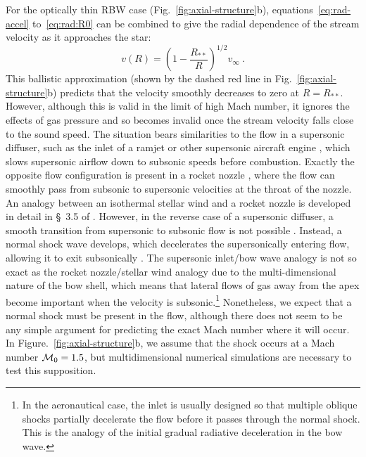For the optically thin RBW case (Fig.~\ref{fig:axial-structure}b),
equations~\eqref{eq:rad-accel} to~\eqref{eq:rad:R0} can be combined to
give the radial dependence of the stream velocity as it approaches the
star:
\begin{equation}
  \label{eq:v-RBW-ballistic}
  v(R) = \left( 1 - \frac{R_{**}}{R} \right)^{1/2} v_\infty \ .
\end{equation}
This ballistic approximation (shown by the dashed red line in
Fig.~\ref{fig:axial-structure}b) predicts that the velocity smoothly
decreases to zero at \(R = R_{**}\).  However, although this is valid
in the limit of high Mach number, it ignores the effects of gas
pressure and so becomes invalid once the stream velocity falls close
to the sound speed.  The situation bears similarities to the flow in a
supersonic diffuser, such as the inlet of a ramjet or other supersonic
aircraft engine \citep{Seddon:1999a}, which slows supersonic airflow
down to subsonic speeds before combustion.  Exactly the opposite flow
configuration is present in a rocket nozzle \citep{Courant:1948a},
where the flow can smoothly pass from subsonic to supersonic
velocities at the throat of the nozzle.  An analogy between an
isothermal stellar wind and a rocket nozzle is developed in detail in
\S~3.5 of \citet{Lamers:1999b}.  However, in the reverse case of a
supersonic diffuser, a smooth transition from supersonic to subsonic
flow is not possible \citep{Morawetz:1956a}.  Instead, a normal shock
wave develops, which decelerates the supersonically entering flow,
allowing it to exit subsonically \citep{Embid:1984a, Hafez:1999a}.
The supersonic inlet/bow wave analogy is not so exact as the rocket
nozzle/stellar wind analogy due to the multi-dimensional nature of the
bow shell, which means that lateral flows of gas away from the apex
become important when the velocity is subsonic.\footnote{%
  In the aeronautical case, the inlet is usually designed so that
  multiple oblique shocks partially decelerate the flow before it
  passes through the normal shock.  This is the analogy of the initial
  gradual radiative deceleration in the bow wave.  } %
Nonetheless, we expect that a normal shock must be present in the
flow, although there does not seem to be any simple argument for
predicting the exact Mach number where it will occur.  In
Figure.~\ref{fig:axial-structure}b, we assume that the shock occurs at
a Mach number \(\mathcal{M}_0 = 1.5\), but multidimensional numerical
simulations are necessary to test this supposition.

